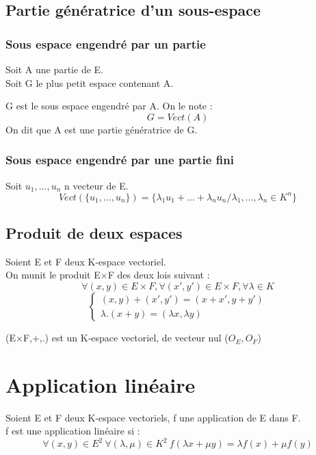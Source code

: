 \subsection{Partie génératrice d'un sous-espace}
\subsubsection{Sous espace engendré par un partie}
Soit A une partie de E.\\
Soit G le plus petit espace contenant A.
\begin{de}
G est le sous espace engendré par A. On le note : $$G = Vect(A)$$
On dit que A est une partie génératrice de G.
\end{de}
\subsubsection{Sous espace engendré par une partie fini}
Soit $u_1,...,u_n$ n vecteur de E. 
$$Vect(\{ u_1,...,u_n \}) = \{ \lambda_1u_1+...+\lambda_nu_n / \lambda_1,...,\lambda_n \in K^n \}$$
\subsection{Produit de deux espaces}
\begin{de}
Soient E et F deux K-espace vectoriel.\\
On munit le produit E$\times$F des deux lois suivant :
$$\forall(x,y) \in E\times F, \forall(x',y') \in E\times F, \forall \lambda \in K $$
$$\left\{\begin{array}{l}
   (x,y)+(x',y') = (x+x',y+y')\\
   \lambda.(x+y) = (\lambda x,\lambda y)
  \end{array}\right.$$
\end{de}
\begin{prop}
 (E$\times$F,+,.) est un K-espace vectoriel, de vecteur nul ($O_E,O_F$)
\end{prop}
\section{Application linéaire}
\begin{de}
Soient E et F deux K-espace vectoriels, f une application de E dans F.\\
f est une application linéaire si :
$$\forall(x,y) \in E^2~ \forall (\lambda,\mu) \in K^2~ f(\lambda x+\mu y) = \lambda f(x) + \mu f(y)$$
\end{de}
